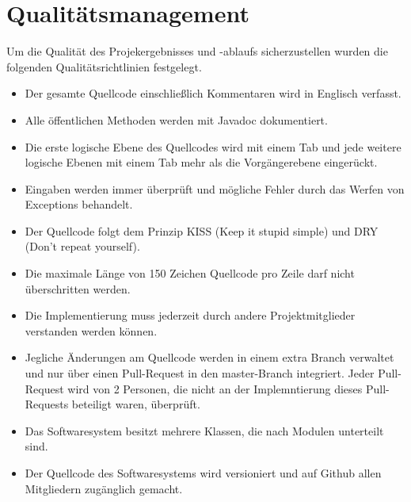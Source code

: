 \section{Qualitätsmanagement}
Um die Qualität des Projekergebnisses und -ablaufs sicherzustellen wurden die folgenden Qualitätsrichtlinien festgelegt.

\begin{itemize}
\item Der gesamte Quellcode einschließlich Kommentaren wird in Englisch verfasst.
\item Alle öffentlichen Methoden werden mit Javadoc dokumentiert.
\item Die erste logische Ebene des Quellcodes wird mit einem Tab und jede weitere logische Ebenen mit einem Tab mehr als die Vorgängerebene eingerückt.
\item Eingaben werden immer überprüft und mögliche Fehler durch das Werfen von Exceptions behandelt.
\item Der Quellcode folgt dem Prinzip KISS (Keep it stupid simple) und DRY (Don't repeat yourself).
\item Die maximale Länge von 150 Zeichen Quellcode pro Zeile darf nicht überschritten werden.
\item Die Implementierung muss jederzeit durch andere Projektmitglieder verstanden werden können.
\item Jegliche Änderungen am Quellcode werden in einem extra Branch verwaltet und nur über einen Pull-Request in den master-Branch integriert. Jeder Pull-Request wird von 2 Personen, die nicht an der Implemntierung dieses Pull-Requests beteiligt waren, überprüft.
\item Das Softwaresystem besitzt mehrere Klassen, die nach Modulen unterteilt sind.
\item Der Quellcode des Softwaresystems wird versioniert und auf Github allen Mitgliedern zugänglich gemacht.
\end{itemize}

